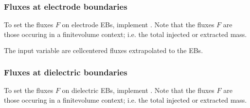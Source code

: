 \documentclass[letterpaper,10pt,english]{sphinxmanual}
\begin{document}
\subsubsection{Fluxes at electrode boundaries}
\label{\detokenize{Applications/CdrPlasmaModel:fluxes-at-electrode-boundaries}}
To set the fluxes \(F\) on electrode EBs, implement .
Note that the fluxes \(F\) are those occuring in a finite\sphinxhyphen{}volume context; i.e. the total injected or extracted mass.

\begin{sphinxVerbatim}[commandchars=\\\{\},formatcom=\scriptsize]
           
                                             
                                             
                                             
                                         
                                         
                                         
                                         
                                           
     
\end{sphinxVerbatim}

The input variable  are cell\sphinxhyphen{}centered fluxes extrapolated to the EBs.


\subsubsection{Fluxes at dielectric boundaries}
\label{\detokenize{Applications/CdrPlasmaModel:fluxes-at-dielectric-boundaries}}
To set the fluxes \(F\) on dielectric EBs, implement .
Note that the fluxes \(F\) are those occuring in a finite\sphinxhyphen{}volume context; i.e. the total injected or extracted mass.
\end{document}
